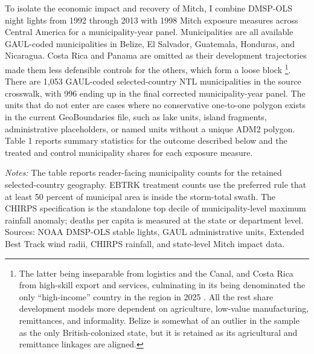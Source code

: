 \documentclass[12pt]{article}
\newcommand{\tablenotes}[1]{\vspace{0.3em}\begin{minipage}{0.92\linewidth}\footnotesize\emph{Notes:} #1\end{minipage}}
\begin{document}
To isolate the economic impact and recovery of Mitch, I combine DMSP-OLS night lights from 1992 through 2013 with 1998 Mitch exposure measures across Central America for a municipality-year panel. Municipalities are all available GAUL-coded municipalities in Belize, El Salvador, Guatemala, Honduras, and Nicaragua. Costa Rica and Panama are omitted as their development trajectories made them less defensible controls for the others, which form a loose block \footnote{The latter being inseparable from logistics and the Canal, and Costa Rica from high-skill export and services, culminating in its being denominated the only ``high-income'' country in the region in 2025 \parencite{worldbank2025countrygroups}. All the rest share development models more dependent on agriculture, low-value manufacturing, remittances, and informality. Belize is somewhat of an outlier in the sample as the only British-colonized state, but it is retained as its agricultural and remittance linkages are aligned.}. There are 1,053 GAUL-coded selected-country NTL municipalities in the source crosswalk, with 996 ending up in the final corrected municipality-year panel. The units that do not enter are cases where no conservative one-to-one polygon exists in the current GeoBoundaries file, such as lake units, island fragments, administrative placeholders, or named units without a unique ADM2 polygon. Table 1 reports summary statistics for the outcome described below and the treated and control municipality shares for each exposure measure.

\begin{table}[htbp]
\centering
\caption{\label{tab:exposure-summary}Data and exposure summary statistics}
\begingroup
\scriptsize
\setlength{\tabcolsep}{3pt}
\resizebox{\linewidth}{!}{%

}
\endgroup
\tablenotes{The table reports reader-facing municipality counts for the retained selected-country geography. EBTRK treatment counts use the preferred rule that at least 50 percent of municipal area is inside the storm-total swath. The CHIRPS specification is the standalone top decile of municipality-level maximum rainfall anomaly; deaths per capita is measured at the state or department level. Sources: NOAA DMSP-OLS stable lights, GAUL administrative units, Extended Best Track wind radii, CHIRPS rainfall, and state-level Mitch impact data.}
\end{table}
\end{document}
